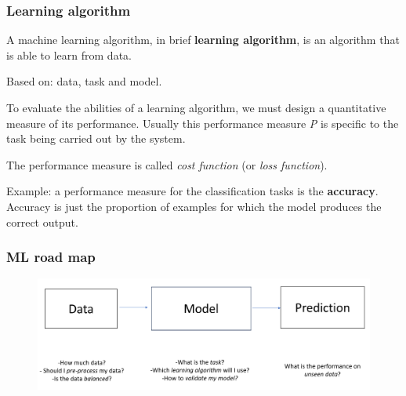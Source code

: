 \documentclass{beamer}
\begin{document}
	\begin{frame}
		\frametitle{Learning algorithm}
		A machine learning algorithm, in brief \textbf{learning algorithm}, is an algorithm that is able to learn from data.
		
		\vspace{5mm}
		
		Based on: data, task and model.
		
		\vspace{5mm}
		
		To evaluate the abilities of a learning algorithm, we must design a quantitative measure of its performance. Usually this performance measure \textit{P} is speciﬁc to the task being carried out by the system.
		
		\vspace{5mm}
		
		The performance measure is called \textsl{cost function} (or \textsl{loss function}).
		
		\vspace{5mm}
		
		Example: a performance measure for the classification tasks is the \textbf{accuracy}. Accuracy is just the proportion of examples for which the model produces the correct output.
	\end{frame}

	\begin{frame}
		\frametitle{ML road map}
		\begin{figure}
			\centering
			\includegraphics[scale=0.4]{images/road-map}
		\end{figure}
	\end{frame}

	
	
\end{document}
